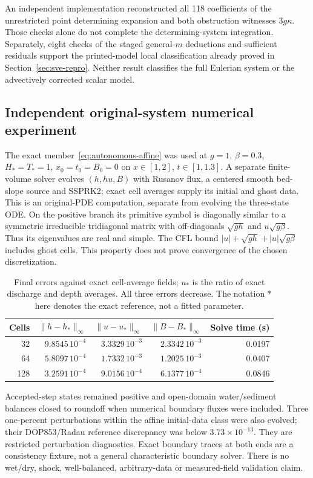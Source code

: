 An independent implementation reconstructed all 118 coefficients of the
unrestricted point determining expansion and both obstruction witnesses
$3g\kappa$. Those checks alone do not complete the determining-system
integration. Separately, eight checks of the staged general-$m$ deductions
and sufficient residuals support the printed-model local classification
already proved in Section~\ref{sec:sve-repro}. Neither result classifies
the full Eulerian system or the advectively corrected scalar model.

\subsection{Independent original-system numerical experiment}
The exact member~\eqref{eq:autonomous-affine} was used at $g=1$,
$\beta=0.3$, $H_*=T_*=1$, $x_0=t_0=B_0=0$ on
$x\in[1,2]$, $t\in[1,1.3]$. A separate finite-volume solver evolves
$(h,hu,B)$ with Rusanov flux, a centered smooth bed-slope source and
SSPRK2; exact cell averages supply its initial and ghost data. This is an
original-PDE computation, separate from evolving the three-state ODE.
On the positive branch its primitive symbol is diagonally similar to a
symmetric irreducible tridiagonal matrix with off-diagonals
$\sqrt{gh}$ and $u\sqrt{g\beta}$. Thus its eigenvalues are real and
simple. The CFL bound $|u|+\sqrt{gh}+|u|\sqrt{g\beta}$ includes ghost
cells. This property does not prove convergence of the chosen discretization.

\begin{table}[htbp]\centering\small
\begin{tabular}{@{}rrrrr@{}}\toprule
Cells & $\|h-h_*\|_\infty$ & $\|u-u_*\|_\infty$
& $\|B-B_*\|_\infty$ & Solve time (s) \\\midrule
32 & $9.8545\,10^{-4}$ & $3.3329\,10^{-3}$ & $2.3342\,10^{-3}$ & 0.0197 \\
64 & $5.8097\,10^{-4}$ & $1.7332\,10^{-3}$ & $1.2025\,10^{-3}$ & 0.0407 \\
128 & $3.2591\,10^{-4}$ & $9.0156\,10^{-4}$ & $6.1377\,10^{-4}$ & 0.0846 \\\bottomrule
\end{tabular}
\caption{Final errors against exact cell-average fields; $u_*$ is the
ratio of exact discharge and depth averages. All three errors decrease.
The notation $*$ here denotes the exact reference, not a fitted parameter.}
\label{tab:autonomous-pde}
\end{table}

Accepted-step states remained positive and open-domain water/sediment
balances closed to roundoff when numerical boundary fluxes were included.
Three one-percent perturbations within the affine initial-data class were
also evolved; their DOP853/Radau reference discrepancy was below
$3.73\times10^{-13}$. They are restricted perturbation diagnostics.
Exact boundary traces at both ends are a consistency fixture, not a general
characteristic boundary solver. There is no wet/dry, shock, well-balanced,
arbitrary-data or measured-field validation claim.

